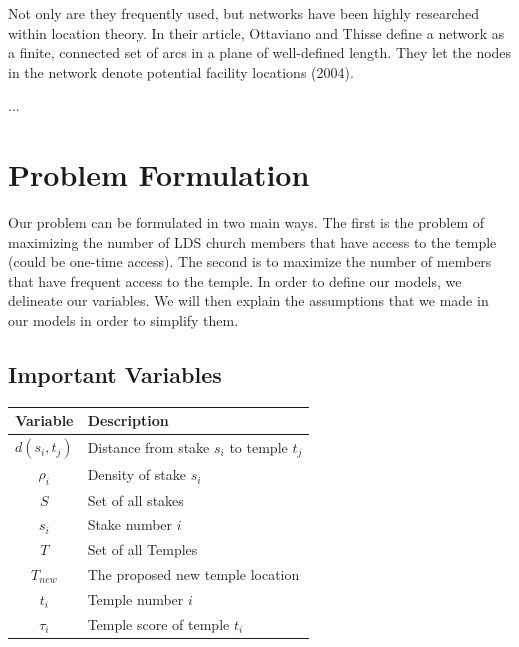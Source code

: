 \documentclass[twoside,twocolumn]{article}
\begin{document}
Not only are they frequently used, but networks have been highly researched within location theory.
In their article, Ottaviano and Thisse define a network as a finite, connected set of arcs in a plane of well-defined length.
They let the nodes in the network denote potential facility locations (2004).


...

\section{Problem Formulation}
\label{sec:prob}

Our problem can be formulated in two main ways. 
The first is the problem of maximizing the number of LDS church members that have access to the temple (could be one-time access).
The second is to maximize the number of members that have frequent access to the temple. %
In order to define our models, we delineate our variables.
We will then explain the assumptions that we made in our models in order to simplify them.

\subsection{Important Variables}
\begin{tabular}{c | l}
Variable & Description\\
\hline
$d(s_{i},t_{j})$ & Distance from stake $s_{i}$ to temple $t_{j}$\\
$\rho_{i}$ & Density of stake $s_{i}$\\
$S$ & Set of all stakes\\
$s_{i}$ & Stake number $i$\\
$T$ & Set of all Temples\\
$T_{new}$ & The proposed new temple location\\
$t_{i}$ & Temple number $i$ \\
$\tau_{i}$ & Temple score of temple $t_{i}$\\
\end{tabular}
\vspace{0.1in}
\end{document}
